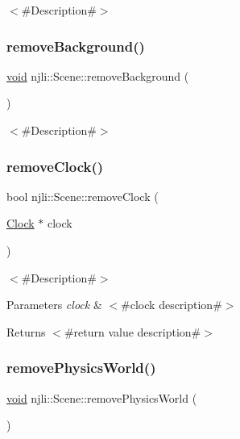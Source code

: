 $<$\#\+Description\#$>$ \mbox{\label{classnjli_1_1_scene_a9186fa26416275bd05fdcc0357fa1745}} 
\subsubsection{\texorpdfstring{remove\+Background()}{removeBackground()}}
{\footnotesize\ttfamily \mbox{\hyperlink{_thread_8h_af1e856da2e658414cb2456cb6f7ebc66}{void}} njli\+::\+Scene\+::remove\+Background (\begin{DoxyParamCaption}{ }\end{DoxyParamCaption})}

$<$\#\+Description\#$>$ \mbox{\label{classnjli_1_1_scene_a52ebc14871130c84d52d2db461cdd1fe}} 
\subsubsection{\texorpdfstring{remove\+Clock()}{removeClock()}}
{\footnotesize\ttfamily bool njli\+::\+Scene\+::remove\+Clock (\begin{DoxyParamCaption}\item[{\mbox{\hyperlink{classnjli_1_1_clock}{Clock}} $\ast$}]{clock }\end{DoxyParamCaption})}

$<$\#\+Description\#$>$


\begin{DoxyParams}{Parameters}
{\em clock} & $<$\#clock description\#$>$\\
\hline
\end{DoxyParams}
\begin{DoxyReturn}{Returns}
$<$\#return value description\#$>$ 
\end{DoxyReturn}
\mbox{\label{classnjli_1_1_scene_a967c76f1e30d1690cd5c7425f3dd2f29}} 
\subsubsection{\texorpdfstring{remove\+Physics\+World()}{removePhysicsWorld()}}
{\footnotesize\ttfamily \mbox{\hyperlink{_thread_8h_af1e856da2e658414cb2456cb6f7ebc66}{void}} njli\+::\+Scene\+::remove\+Physics\+World (\begin{DoxyParamCaption}{ }\end{DoxyParamCaption})}

